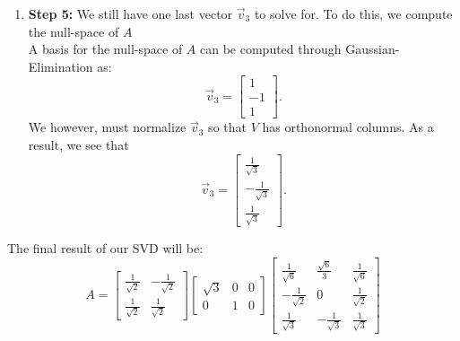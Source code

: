 \begin{enumerate}
{\begin{enumerate}[label=(\roman*)]
        We now solve for the vectors in the $U$ matrix through the equation $\vec{u}_i = \frac{A \vec{v}_i}{\sigma_i}$
        $$\vec{u}_{1} = \frac{A \vec{v}_{1}}{\sqrt{3}} = 
        \begin{bmatrix} \frac{1}{\sqrt{6}} \\ \frac{\sqrt{6}}{3} \\ \frac{1}{\sqrt{6}} \end{bmatrix}$$
        $$\vec{u}_{2} = \frac{A \vec{v}_{2}}{1} = 
        \begin{bmatrix} -\frac{1}{\sqrt{2}} \\ 0 \\ \frac{1}{\sqrt{2}} \end{bmatrix}$$
      \item \textbf{Step 5:}
        We still have one last vector $\vec{v}_{3}$ to solve for. To do this, we compute the null-space of $A$ \\
        A basis for the null-space of $A$ can be computed through Gaussian-Elimination as:
        $$\vec{v}_{3} = \begin{bmatrix} 1 \\ -1 \\ 1 \end{bmatrix}.$$
        We however, must normalize $\vec{v}_{3}$ so that $V$ has orthonormal columns. As a result, we see that
        $$\vec{v}_{3} = \begin{bmatrix} \frac{1}{\sqrt{3}} \\ - \frac{1}{\sqrt{3}} \\ \frac{1}{\sqrt{3}} \end{bmatrix}.$$
    \end{enumerate}
    The final result of our SVD will be:
    \begin{equation}
      A = \begin{bmatrix} \frac{1}{\sqrt{2}} & -\frac{1}{\sqrt{2}} \\ \frac{1}{\sqrt{2}} & \frac{1}{\sqrt{2}} \end{bmatrix} 
      \begin{bmatrix} \sqrt{3} & 0 & 0 \\ 0 & 1 & 0 \end{bmatrix} 
      \begin{bmatrix} \frac{1}{\sqrt{6}} & \frac{\sqrt{6}}{3} & \frac{1}{\sqrt{6}} \\
      -\frac{1}{\sqrt{2}} & 0 & \frac{1}{\sqrt{2}} \\
      \frac{1}{\sqrt{3}} & - \frac{1}{\sqrt{3}} & \frac{1}{\sqrt{3}} \end{bmatrix}
    \end{equation}
  }
\end{enumerate}









